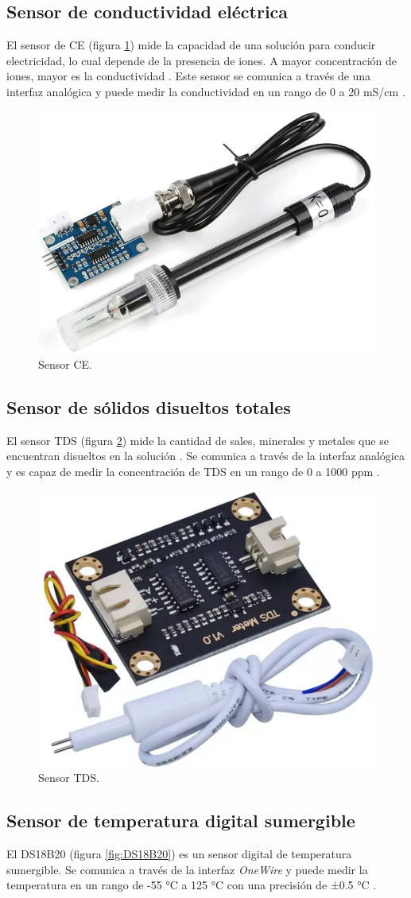 \subsection{Sensor de conductividad eléctrica}

El sensor de CE (figura \ref{fig:CE}) mide la capacidad de una solución para
conducir electricidad, lo cual depende de la presencia de iones. A mayor
concentración de iones, mayor es la conductividad \cite{MTConductivitySensor}.
Este sensor se comunica a través de una interfaz analógica y puede medir la
conductividad en un rango de 0 a 20 mS/cm \cite{EC-Sensor}.

\begin{figure}[H]
	\centering
	\includegraphics[height=.15\textwidth]{./Images/8.png}
	\caption{Sensor CE.}
	\label{fig:CE}
\end{figure}

\subsection{Sensor de sólidos disueltos totales}

El sensor TDS (figura \ref{fig:TDS}) mide la cantidad de sales, minerales y
metales que se encuentran disueltos en la solución \cite{TDS-description}. Se
comunica a través de la interfaz analógica y es capaz de medir la concentración
de TDS en un rango de 0 a 1000 ppm \cite{TDS-Sensor}.

\begin{figure}[H]
	\centering
	\includegraphics[height=.15\textwidth]{./Images/9.png}
	\caption{Sensor TDS.}
	\label{fig:TDS}
\end{figure}

\subsection{Sensor de temperatura digital sumergible}

El DS18B20 (figura \ref{fig:DS18B20}) es un sensor digital de temperatura
sumergible. Se comunica a través de la interfaz \textit{OneWire} y puede medir
la temperatura en un rango de -55 °C a 125 °C con una precisión de ±0.5 °C
\cite{DS18B20}.

